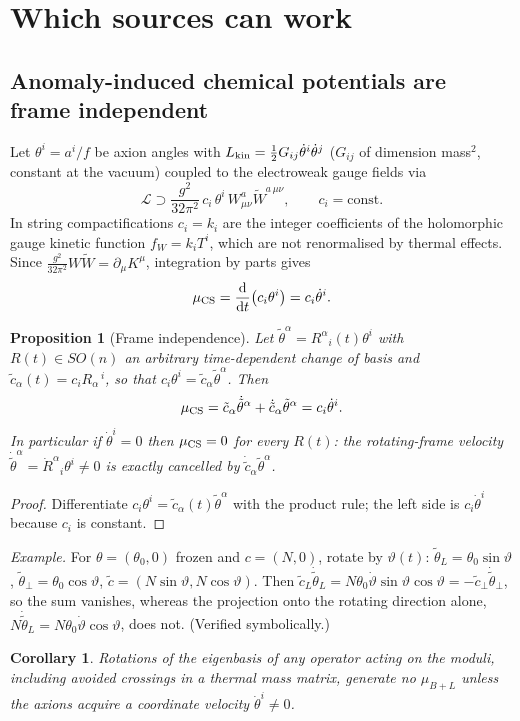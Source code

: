 \documentclass[11pt]{article}
\newtheorem{proposition}{Proposition}
\newtheorem{corollary}{Corollary}
\newcommand{\dd}{\mathrm d}
\begin{document}
\section{Which sources can work}\label{sec:sources}
\subsection{Anomaly-induced chemical potentials are frame independent}
Let $\theta^i=a^i/f$ be axion angles with $L_{\rm kin}=\tfrac12G_{ij}\dot\theta^i\dot\theta^j$ ($G_{ij}$ of dimension mass$^2$, constant at the vacuum) coupled to the electroweak gauge fields via
\begin{equation}
\mathcal L\supset\frac{g^2}{32\pi^2}\,c_i\,\theta^i\,W^a_{\mu\nu}\widetilde W^{a\,\mu\nu},\qquad c_i=\text{const}.\label{eq:anom}
\end{equation}
In string compactifications $c_i=k_i$ are the integer coefficients of the holomorphic gauge kinetic function $f_W=k_iT^i$, which are not renormalised by thermal effects. Since $\tfrac{g^2}{32\pi^2}W\widetilde W=\partial_\mu K^\mu$, integration by parts gives
\begin{equation}
\mu_{\rm CS}=\frac{\dd}{\dd t}\big(c_i\theta^i\big)=c_i\dot\theta^i.
\end{equation}
\begin{proposition}[Frame independence]\label{prop:frame}
Let $\tilde\theta^\alpha=R^\alpha{}_i(t)\theta^i$ with $R(t)\in SO(n)$ an arbitrary time-dependent change of basis and $\tilde c_\alpha(t)=c_iR_\alpha{}^{\,i}$, so that $c_i\theta^i=\tilde c_\alpha\tilde\theta^\alpha$. Then
\begin{equation}
\mu_{\rm CS}=\tilde c_\alpha\dot{\tilde\theta}^\alpha+\dot{\tilde c}_\alpha\tilde\theta^\alpha=c_i\dot\theta^i .
\end{equation}
In particular if $\dot\theta^i=0$ then $\mu_{\rm CS}=0$ for every $R(t)$: the rotating-frame velocity $\dot{\tilde\theta}^\alpha=\dot R^\alpha{}_i\theta^i\neq0$ is exactly cancelled by $\dot{\tilde c}_\alpha\tilde\theta^\alpha$.
\end{proposition}
\begin{proof}
Differentiate $c_i\theta^i=\tilde c_\alpha(t)\tilde\theta^\alpha$ with the product rule; the left side is $c_i\dot\theta^i$ because $c_i$ is constant.
\end{proof}
\noindent\emph{Example.} For $\theta=(\theta_0,0)$ frozen and $c=(N,0)$, rotate by $\vartheta(t)$: $\tilde\theta_L=\theta_0\sin\vartheta$, $\tilde\theta_\perp=\theta_0\cos\vartheta$, $\tilde c=(N\sin\vartheta,N\cos\vartheta)$. Then $\tilde c_L\dot{\tilde\theta}_L=N\theta_0\dot\vartheta\sin\vartheta\cos\vartheta=-\tilde c_\perp\dot{\tilde\theta}_\perp$, so the sum vanishes, whereas the projection onto the rotating direction alone, $N\dot{\tilde\theta}_L=N\theta_0\dot\vartheta\cos\vartheta$, does not. (Verified symbolically.)
\begin{corollary}
Rotations of the eigenbasis of any operator acting on the moduli, including avoided crossings in a thermal mass matrix, generate no $\mu_{B+L}$ unless the axions acquire a coordinate velocity $\dot\theta^i\neq0$.
\end{corollary}
\end{document}

